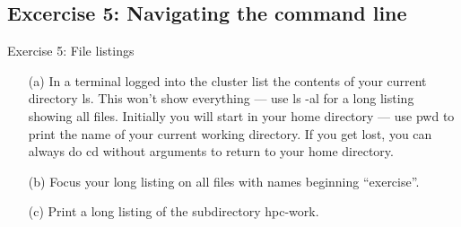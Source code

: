 \subsection{Excercise 5: Navigating the command line}
\begin{frame}{Exercise 5: File listings}
\begin{itemize}

\item[(a)]{In a terminal logged into the cluster list the contents of your current directory \alert{ls}. This won't show everything --- use \alert{ls -al} for a long listing showing all files. Initially you will start in your home directory --- use \alert{pwd} to print the name of your current working directory. If you get lost, you can always do \alert{cd} without arguments to return to your home directory.}

\item[(b)]{Focus your long listing on \alert{all files with names beginning ``exercise''}.}

\item[(c)]{Print a long listing of the subdirectory \alert{hpc-work}.}

\end{itemize}
\end{frame}








